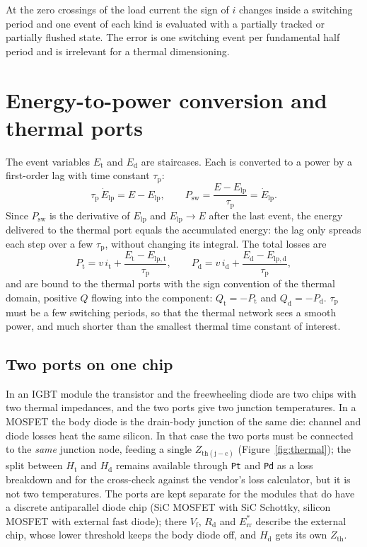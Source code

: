 \documentclass[11pt,a4paper]{article}
\newcommand{\Err}{E_{\mathrm{rr}}}
\newcommand{\Ht}{H_{\mathrm{t}}}
\newcommand{\Hd}{H_{\mathrm{d}}}
\newcommand{\taup}{\tau_{\mathrm{p}}}
\newcommand{\code}[1]{\texttt{#1}}
\begin{document}
At the zero crossings of the load current the sign of $i$ changes inside a
switching period and one event of each kind is evaluated with a partially
tracked or partially flushed state. The error is one switching event per
fundamental half period and is irrelevant for a thermal dimensioning.

\section{Energy-to-power conversion and thermal ports}

The event variables $E_\mathrm{t}$ and $E_\mathrm{d}$ are staircases. Each is
converted to a power by a first-order lag with time constant $\taup$:
\begin{equation}
\taup\,\dot{E}_\mathrm{lp} = E - E_\mathrm{lp}, \qquad
P_\mathrm{sw} = \frac{E - E_\mathrm{lp}}{\taup} = \dot{E}_\mathrm{lp}.
\label{eq:lag}
\end{equation}
Since $P_\mathrm{sw}$ is the derivative of $E_\mathrm{lp}$ and
$E_\mathrm{lp}\to E$ after the last event, the energy delivered to the thermal
port equals the accumulated energy: the lag only spreads each step over a few
$\taup$, without changing its integral. The total losses are
\begin{equation}
P_\mathrm{t} = v\,i_\mathrm{t} + \frac{E_\mathrm{t}-E_\mathrm{lp,t}}{\taup},
\qquad
P_\mathrm{d} = v\,i_\mathrm{d} + \frac{E_\mathrm{d}-E_\mathrm{lp,d}}{\taup},
\end{equation}
and are bound to the thermal ports with the sign convention of the thermal
domain, positive $Q$ flowing into the component: $Q_\mathrm{t} = -P_\mathrm{t}$
and $Q_\mathrm{d} = -P_\mathrm{d}$. $\taup$ must be a few switching periods,
so that the thermal network sees a smooth power, and much shorter than the
smallest thermal time constant of interest.

\subsection{Two ports on one chip}
\label{sec:onechip}

In an IGBT module the transistor and the freewheeling diode are two chips
with two thermal impedances, and the two ports give two junction
temperatures. In a MOSFET the body diode is the drain-body junction of the
same die: channel and diode losses heat the same silicon. In that case the
two ports must be connected to the \emph{same} junction node, feeding a single
$Z_\mathrm{th(j-c)}$ (Figure~\ref{fig:thermal}); the split between $\Ht$ and
$\Hd$ remains available through \code{Pt} and \code{Pd} as a loss breakdown
and for the cross-check against the vendor's loss calculator, but it is not two
temperatures. The ports are kept separate for the modules that do have a
discrete antiparallel diode chip (SiC MOSFET with SiC Schottky, silicon MOSFET
with external fast diode); there $V_\mathrm{f}$, $R_\mathrm{d}$ and $\Err^\ast$
describe the external chip, whose lower threshold keeps the body diode off, and
$\Hd$ gets its own $Z_\mathrm{th}$.
\end{document}
